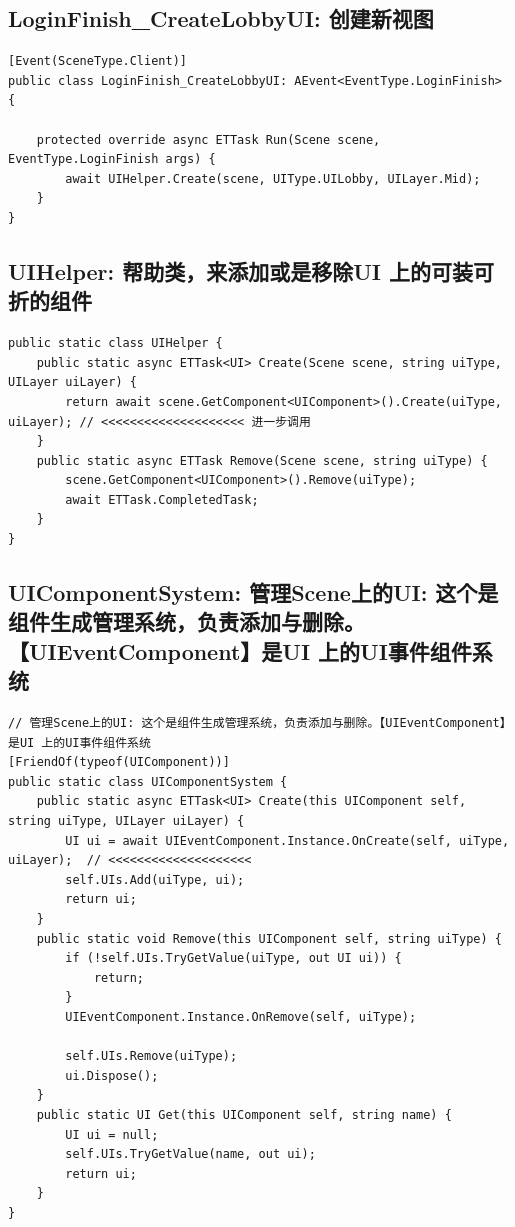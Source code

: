 \documentclass[9pt, b5paper]{article}
\begin{document}
\subsection{LoginFinish\_CreateLobbyUI: 创建新视图}
\label{sec-7-3}
\begin{verbatim}
[Event(SceneType.Client)]
public class LoginFinish_CreateLobbyUI: AEvent<EventType.LoginFinish> {

    protected override async ETTask Run(Scene scene, EventType.LoginFinish args) {
        await UIHelper.Create(scene, UIType.UILobby, UILayer.Mid);
    }
}
\end{verbatim}
\subsection{UIHelper: 帮助类，来添加或是移除UI 上的可装可折的组件}
\label{sec-7-4}
\begin{verbatim}
public static class UIHelper {
    public static async ETTask<UI> Create(Scene scene, string uiType, UILayer uiLayer) {
        return await scene.GetComponent<UIComponent>().Create(uiType, uiLayer); // <<<<<<<<<<<<<<<<<<<< 进一步调用 
    }
    public static async ETTask Remove(Scene scene, string uiType) {
        scene.GetComponent<UIComponent>().Remove(uiType);
        await ETTask.CompletedTask;
    }
}
\end{verbatim}
\subsection{UIComponentSystem: 管理Scene上的UI: 这个是组件生成管理系统，负责添加与删除。【UIEventComponent】是UI 上的UI事件组件系统}
\label{sec-7-5}
\begin{verbatim}
// 管理Scene上的UI: 这个是组件生成管理系统，负责添加与删除。【UIEventComponent】是UI 上的UI事件组件系统
[FriendOf(typeof(UIComponent))]
public static class UIComponentSystem {
    public static async ETTask<UI> Create(this UIComponent self, string uiType, UILayer uiLayer) {
        UI ui = await UIEventComponent.Instance.OnCreate(self, uiType, uiLayer);  // <<<<<<<<<<<<<<<<<<<< 
        self.UIs.Add(uiType, ui);
        return ui;
    }
    public static void Remove(this UIComponent self, string uiType) {
        if (!self.UIs.TryGetValue(uiType, out UI ui)) {
            return;
        }
        UIEventComponent.Instance.OnRemove(self, uiType);

        self.UIs.Remove(uiType);
        ui.Dispose();
    }
    public static UI Get(this UIComponent self, string name) {
        UI ui = null;
        self.UIs.TryGetValue(name, out ui);
        return ui;
    }
}
\end{verbatim}
\end{document}
